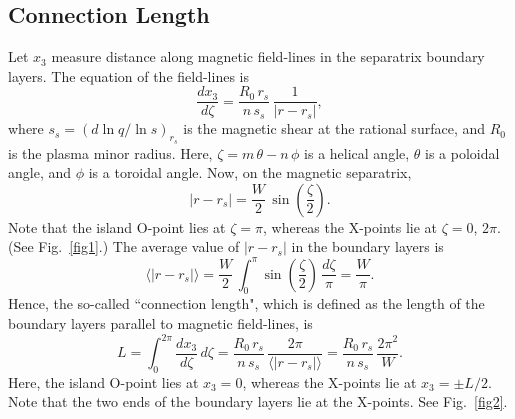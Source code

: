 \documentclass[12pt,prb,aps]{revtex4-1}
\begin{document}
\subsection{Connection Length}
Let $x_3$ measure distance along magnetic field-lines in the separatrix boundary layers. The equation of the field-lines is\,\cite{rf}
\begin{equation}
\frac{dx_3}{d\zeta} =\frac{R_0\,r_s}{n\,s_s}\,\frac{1}{|r-r_s|},
\end{equation}
where $s_s = (d\ln q/\ln s)_{r_s}$ is the magnetic shear at the rational surface, and $R_0$ is the plasma minor radius. Here, $\zeta=m\,\theta-n\,\phi$ is a helical angle, $\theta$ is
a poloidal angle, and $\phi$ is a toroidal angle. 
 Now, on the magnetic separatrix,\cite{rf}
\begin{equation}
|r-r_s| = \frac{W}{2}\,\sin\left(\frac{\zeta}{2}\right).
\end{equation}
Note that the island O-point lies at $\zeta=\pi$, whereas the X-points lie at $\zeta=0$, $2\pi$. (See Fig.~\ref{fig1}.) The average value of $|r-r_s|$ in the boundary layers is
\begin{equation}
\langle |r-r_s|\rangle  =\frac{W}{2}\,\int_0^\pi \sin\left(\frac{\zeta}{2}\right)\,\frac{d\zeta}{\pi}= \frac{W}{\pi}.
\end{equation}
Hence, the so-called ``connection length", which is defined as the length of the boundary layers parallel to magnetic field-lines, is
\begin{equation}
L = \int_0^{2\pi}\frac{dx_3}{d\zeta}\,d\zeta = \frac{R_0\,r_s}{n\,s_s}\,\frac{2\pi}{\langle|r-r_s|\rangle} = \frac{R_0\,r_s}{n\,s_s}\,\frac{2\pi^2}{W}.
\end{equation}
Here, the island O-point lies at $x_3=0$, whereas the X-points lie at $x_3=\pm L/2$. Note that the two ends of the boundary layers lie at the X-points. See Fig.~\ref{fig2}.
\end{document}

